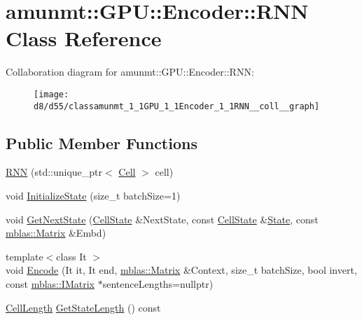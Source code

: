 \hypertarget{classamunmt_1_1GPU_1_1Encoder_1_1RNN}{}\section{amunmt\+:\+:G\+PU\+:\+:Encoder\+:\+:R\+NN Class Reference}
\label{classamunmt_1_1GPU_1_1Encoder_1_1RNN}


Collaboration diagram for amunmt\+:\+:G\+PU\+:\+:Encoder\+:\+:R\+NN\+:
\nopagebreak
\begin{figure}[H]
\begin{center}
\leavevmode
\texttt{[image: d8/d55/classamunmt\_1\_1GPU\_1\_1Encoder\_1\_1RNN\_\_coll\_\_graph]}
\end{center}
\end{figure}
\subsection*{Public Member Functions}
\begin{DoxyCompactItemize}
\item 
\hyperlink{classamunmt_1_1GPU_1_1Encoder_1_1RNN_a750aca517d363d1b3e74bdafacce7bf4}{R\+NN} (std\+::unique\+\_\+ptr$<$ \hyperlink{classamunmt_1_1GPU_1_1Cell}{Cell} $>$ cell)
\item 
void \hyperlink{classamunmt_1_1GPU_1_1Encoder_1_1RNN_adcec5cfc611a4231bc91cb176ad255ba}{Initialize\+State} (size\+\_\+t batch\+Size=1)
\item 
void \hyperlink{classamunmt_1_1GPU_1_1Encoder_1_1RNN_a52f3ef3e44fc6bf70543d5b264beba94}{Get\+Next\+State} (\hyperlink{structamunmt_1_1GPU_1_1CellState}{Cell\+State} \&Next\+State, const \hyperlink{structamunmt_1_1GPU_1_1CellState}{Cell\+State} \&\hyperlink{classamunmt_1_1State}{State}, const \hyperlink{namespaceamunmt_1_1GPU_1_1mblas_ab67821a8254de53e45a623cf73c0aef6}{mblas\+::\+Matrix} \&Embd)
\item 
{\footnotesize template$<$class It $>$ }\\void \hyperlink{classamunmt_1_1GPU_1_1Encoder_1_1RNN_a957c23ec361936201ad6a0b03dd05dc9}{Encode} (It it, It end, \hyperlink{namespaceamunmt_1_1GPU_1_1mblas_ab67821a8254de53e45a623cf73c0aef6}{mblas\+::\+Matrix} \&Context, size\+\_\+t batch\+Size, bool invert, const \hyperlink{namespaceamunmt_1_1GPU_1_1mblas_ad6a337d269d1833a6028b8871e57d2d0}{mblas\+::\+I\+Matrix} $\ast$sentence\+Lengths=nullptr)
\item 
\hyperlink{structamunmt_1_1GPU_1_1CellLength}{Cell\+Length} \hyperlink{classamunmt_1_1GPU_1_1Encoder_1_1RNN_a72bceb533a19da123fb575ca449692a0}{Get\+State\+Length} () const 
\end{DoxyCompactItemize}
